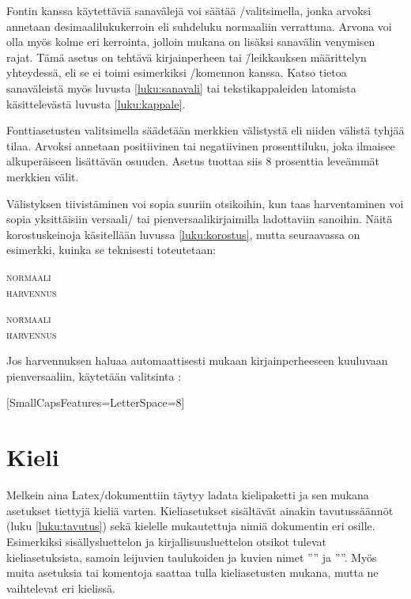 Fontin%
 kanssa käytettäviä sanavälejä voi säätää
\-/valitsimella, jonka arvoksi annetaan
desimaalilukukerroin eli suhdeluku normaaliin verrattuna. Arvona voi
olla myös kolme eri kerrointa, jolloin mukana on lisäksi sanavälin
venymisen rajat. Tämä asetus on tehtävä kirjainperheen tai
\=/leikkauksen määrittelyn yhteydessä, eli se ei toimi esimerkiksi
\-/komennon kanssa. Katso tietoa
sanaväleistä myös luvusta \ref{luku:sanavali} tai tekstikappaleiden
latomista käsittelevästä luvusta \ref{luku:kappale}.

Fontti\-asetusten valitsimella%
  säädetään merkkien
välistystä eli niiden välistä tyhjää tilaa. Arvoksi annetaan
positiivinen tai negatiivinen prosenttiluku, joka ilmaisee alkuperäiseen
lisättävän osuuden. Asetus  tuottaa siis 8
prosenttia leveämmät merkkien välit.

Välistyksen tiivistäminen voi sopia suuriin otsikoihin, kun taas
harventaminen voi sopia yksittäisiin versaali\-/{} tai
pienversaalikirjaimilla ladottaviin sanoihin. Näitä korostuskeinoja
käsitellään luvussa \ref{luku:korostus}, mutta seuraavassa on esimerkki,
kuinka se teknisesti toteutetaan:

\begin{koodilohkosis}
  \scshape normaali \\
  { harvennus}
\end{koodilohkosis}

\begin{tulossis}
  \scshape normaali \\
  { harvennus}
\end{tulossis}

Jos harvennuksen haluaa automaattisesti mukaan kirjainperheeseen
kuuluvaan pienversaaliin, käytetään valitsinta
:

\begin{koodilohkosis}
  \setmainfont{…}[SmallCapsFeatures={LetterSpace=8}]
\end{koodilohkosis}

\section{Kieli}
\label{luku:kieliasetukset}

Melkein aina Latex\-/dokumenttiin täytyy ladata kielipaketti ja sen
mukana asetukset tiettyjä kieliä varten. Kieliasetukset sisältävät
ainakin tavutussäännöt (luku \ref{luku:tavutus}) sekä kielelle
mukautettuja nimiä dokumentin eri osille. Esimerkiksi sisällysluettelon
ja kirjallisuusluettelon otsikot tulevat kieliasetuksista, samoin
leijuvien taulukoiden ja kuvien nimet ''\tablename'' ja ''\figurename''.
Myös muita asetuksia tai komentoja saattaa tulla kieliasetusten mukana,
mutta ne vaihtelevat eri kielissä.

